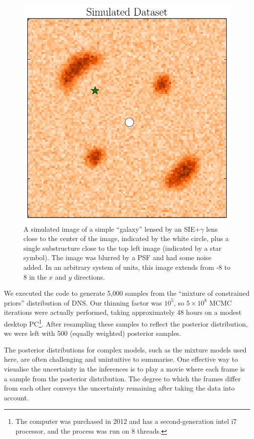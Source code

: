 \documentclass[useAMS,usenatbib]{mn2e}
\newcommand{\revisions}{\color{blue}}
\begin{document}
\begin{figure}
\begin{center}
\includegraphics[scale=0.5]{image1.pdf}
\caption{A simulated image of a simple ``galaxy'' lensed by an SIE+$\gamma$
lens close to the center of the image, indicated by the white circle, plus a
single substructure close to the top left image (indicated by a star symbol).
The image was blurred by a PSF and had some noise added.
In an arbitrary system of units, this image extends from -8 to 8 in the
$x$ and $y$ directions.\label{fig:image1}}
\end{center}
\end{figure}

We executed the code to generate 5,000 samples from the ``mixture of
constrained priors'' distribution of DNS. Our thinning factor was $10^5$,
so $5 \times 10^8$ MCMC iterations were actually performed, taking approximately
48 hours on a modest desktop PC\footnote{The computer was purchased in 2012
and has a second-generation intel i7 processor, and the process was run on
8 threads.}. After resampling these samples to
reflect the posterior distribution, we were left with {\revisions 500}
(equally weighted) posterior samples.

The posterior distributions for complex models, such as the mixture models used here, are often challenging and unintuitive to summarise. One effective way
to visualise the uncertainty in the inferences is to play a movie where each
frame is a sample from the posterior distribution. The degree to which the
frames differ from each other conveys the uncertainty remaining after taking
the data into account.
\end{document}
